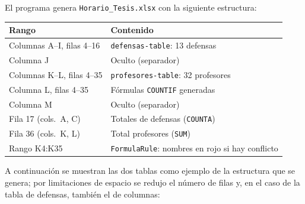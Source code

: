 \documentclass[12pt,a4paper]{report}
\begin{document}
El programa genera \texttt{Horario\_Tesis.xlsx} con la siguiente estructura:

\begin{center}
\renewcommand{\arraystretch}{1.3}
\begin{tabular}{ll}
\toprule
\textbf{Rango} & \textbf{Contenido} \\
\midrule
Columnas A--I, filas 4--16 & \texttt{defensas-table}: 13 defensas \\
Columna J                  & Oculto (separador) \\
Columnas K--L, filas 4--35 & \texttt{profesores-table}: 32 profesores \\
Columna L, filas 4--35     & Fórmulas \texttt{COUNTIF} generadas \\
Columna M                  & Oculto (separador) \\
Fila 17 (cols.\ A, C)      & Totales de defensas (\texttt{COUNTA}) \\
Fila 36 (cols.\ K, L)      & Total profesores (\texttt{SUM}) \\
Rango K4:K35               & \texttt{FormulaRule}: nombres en rojo
                            si hay conflicto \\
\bottomrule
\end{tabular}
\end{center}

A continuación se muestran las dos tablas como ejemplo de la estructura
que se genera; por limitaciones de espacio se redujo el número de filas
y, en el caso de la tabla de defensas, también el de columnas:

\medskip
\end{document}
